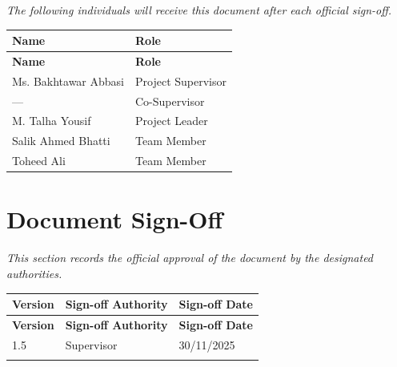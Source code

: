 \documentclass[12pt,a4paper]{article}
\begin{document}
\noindent\textit{The following individuals will receive this document after each official sign-off.}

\vspace{0.5cm}

\begin{longtable}{|L{6cm}|L{7cm}|}
    \hline
    \textbf{Name} & \textbf{Role} \\
    \hline
    \endfirsthead
    
    \hline
    \textbf{Name} & \textbf{Role} \\
    \hline
    \endhead
    
    Ms. Bakhtawar Abbasi & Project Supervisor \\
    \hline
    --- & Co-Supervisor \\
    \hline
    M. Talha Yousif & Project Leader \\
    \hline
    Salik Ahmed Bhatti & Team Member \\
    \hline
    Toheed Ali & Team Member \\
    \hline
\end{longtable}

\section*{Document Sign-Off}

\noindent\textit{This section records the official approval of the document by the designated authorities.}

\vspace{0.5cm}

\begin{longtable}{|C{2.5cm}|L{6cm}|C{4cm}|}
    \hline
    \textbf{Version} & \textbf{Sign-off Authority} & \textbf{Sign-off Date} \\
    \hline
    \endfirsthead
    
    \hline
    \textbf{Version} & \textbf{Sign-off Authority} & \textbf{Sign-off Date} \\
    \hline
    \endhead
    
    1.5 & Supervisor & 30/11/2025 \\
    \hline
    & & \\
    \hline
\end{longtable}
\end{document}
